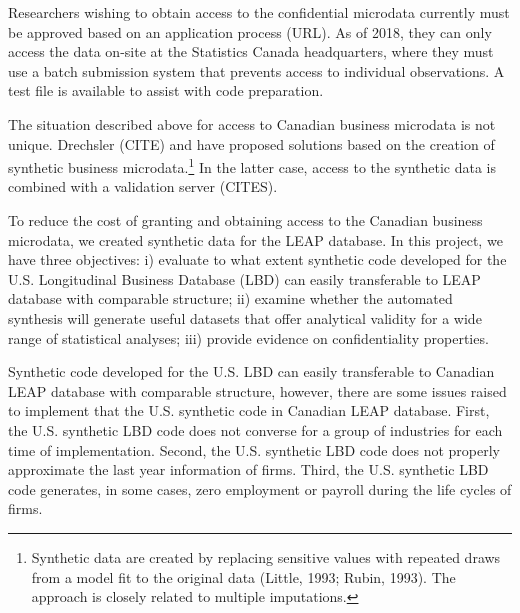 \documentclass{article}
\begin{document}
Researchers wishing to obtain access to the confidential microdata currently must be approved based on an application process (URL). As of 2018, they can only access the data on-site at the Statistics Canada headquarters, where they must use a batch submission system that prevents access to individual observations. A test file is available to assist with code preparation. 


The situation described above for access to Canadian business microdata is not unique. Drechsler (CITE) and \cite{RePEc:bla:istatr:v:79:y:2011:i:3:p:362-384} have proposed solutions based on the creation of synthetic business microdata.\footnote{Synthetic data are created by replacing sensitive values with repeated draws from a model fit to the original data (Little, 1993; Rubin, 1993). The approach is closely related to multiple imputations.} In the latter case, access to the synthetic data is combined with a validation server (CITES). 

To reduce the cost of granting and obtaining access to the Canadian business microdata, we created  synthetic data for the  \ac{LEAP} database. In this project, we have three objectives: i) evaluate to what extent synthetic code developed for the U.S. Longitudinal Business Database (LBD) can easily transferable to LEAP database with comparable structure; ii) examine whether the automated synthesis will generate useful datasets that offer analytical validity for a wide range of statistical analyses; iii) provide evidence on confidentiality properties. 

Synthetic code developed for the U.S. LBD can easily transferable to Canadian LEAP database with comparable structure, however, there are some issues raised to implement that the U.S. synthetic code in Canadian LEAP database. First, the U.S. synthetic LBD code does not converse for a group of industries for each time of implementation. Second, the U.S. synthetic LBD code does not properly approximate the last year information of firms. Third, the U.S. synthetic LBD code generates, in some cases, zero employment or payroll during the life cycles of firms.   
\end{document}
